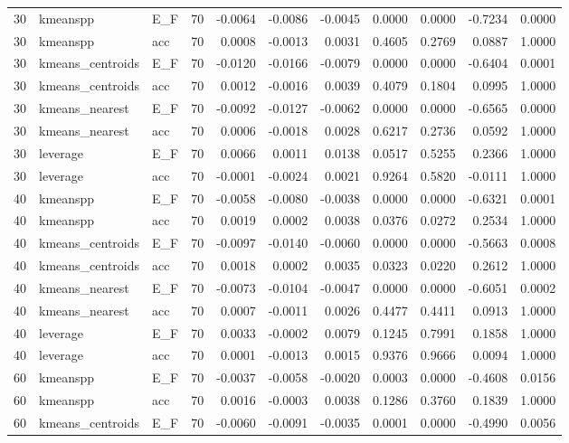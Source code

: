 \begin{table}
\begin{tabular}{rllrrrrrrrr}
30 & kmeanspp & E\_F & 70 & -0.0064 & -0.0086 & -0.0045 & 0.0000 & 0.0000 & -0.7234 & 0.0000 \\
30 & kmeanspp & acc & 70 & 0.0008 & -0.0013 & 0.0031 & 0.4605 & 0.2769 & 0.0887 & 1.0000 \\
30 & kmeans\_centroids & E\_F & 70 & -0.0120 & -0.0166 & -0.0079 & 0.0000 & 0.0000 & -0.6404 & 0.0001 \\
30 & kmeans\_centroids & acc & 70 & 0.0012 & -0.0016 & 0.0039 & 0.4079 & 0.1804 & 0.0995 & 1.0000 \\
30 & kmeans\_nearest & E\_F & 70 & -0.0092 & -0.0127 & -0.0062 & 0.0000 & 0.0000 & -0.6565 & 0.0000 \\
30 & kmeans\_nearest & acc & 70 & 0.0006 & -0.0018 & 0.0028 & 0.6217 & 0.2736 & 0.0592 & 1.0000 \\
30 & leverage & E\_F & 70 & 0.0066 & 0.0011 & 0.0138 & 0.0517 & 0.5255 & 0.2366 & 1.0000 \\
30 & leverage & acc & 70 & -0.0001 & -0.0024 & 0.0021 & 0.9264 & 0.5820 & -0.0111 & 1.0000 \\
40 & kmeanspp & E\_F & 70 & -0.0058 & -0.0080 & -0.0038 & 0.0000 & 0.0000 & -0.6321 & 0.0001 \\
40 & kmeanspp & acc & 70 & 0.0019 & 0.0002 & 0.0038 & 0.0376 & 0.0272 & 0.2534 & 1.0000 \\
40 & kmeans\_centroids & E\_F & 70 & -0.0097 & -0.0140 & -0.0060 & 0.0000 & 0.0000 & -0.5663 & 0.0008 \\
40 & kmeans\_centroids & acc & 70 & 0.0018 & 0.0002 & 0.0035 & 0.0323 & 0.0220 & 0.2612 & 1.0000 \\
40 & kmeans\_nearest & E\_F & 70 & -0.0073 & -0.0104 & -0.0047 & 0.0000 & 0.0000 & -0.6051 & 0.0002 \\
40 & kmeans\_nearest & acc & 70 & 0.0007 & -0.0011 & 0.0026 & 0.4477 & 0.4411 & 0.0913 & 1.0000 \\
40 & leverage & E\_F & 70 & 0.0033 & -0.0002 & 0.0079 & 0.1245 & 0.7991 & 0.1858 & 1.0000 \\
40 & leverage & acc & 70 & 0.0001 & -0.0013 & 0.0015 & 0.9376 & 0.9666 & 0.0094 & 1.0000 \\
60 & kmeanspp & E\_F & 70 & -0.0037 & -0.0058 & -0.0020 & 0.0003 & 0.0000 & -0.4608 & 0.0156 \\
60 & kmeanspp & acc & 70 & 0.0016 & -0.0003 & 0.0038 & 0.1286 & 0.3760 & 0.1839 & 1.0000 \\
60 & kmeans\_centroids & E\_F & 70 & -0.0060 & -0.0091 & -0.0035 & 0.0001 & 0.0000 & -0.4990 & 0.0056 \\

\end{tabular}
\end{table}
